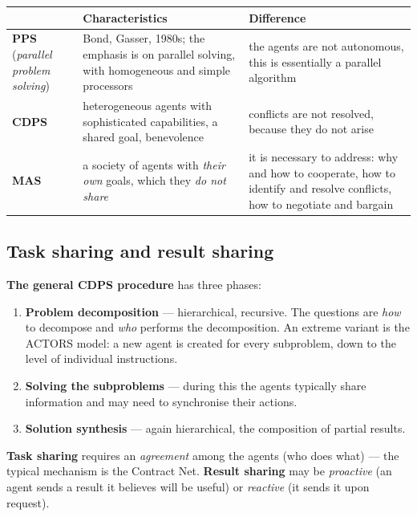 \documentclass[11pt,a4paper]{article}
\theoremstyle{definition}
\begin{document}
\begin{center}\small
\begin{tabular}{p{} p{} p{}}
\toprule
& \textbf{Characteristics} & \textbf{Difference} \\
\midrule
\textbf{PPS} \newline (\emph{parallel problem solving})
  & Bond, Gasser, 1980s; the emphasis is on parallel solving, with homogeneous and simple processors
  & the agents are not autonomous, this is essentially a parallel algorithm \\
\textbf{CDPS}
  & heterogeneous agents with sophisticated capabilities, a shared goal, benevolence
  & conflicts are not resolved, because they do not arise \\
\textbf{MAS}
  & a society of agents with \emph{their own} goals, which they \emph{do not share}
  & it is necessary to address: why and how to cooperate, how to identify and resolve conflicts, how
    to negotiate and bargain \\
\bottomrule
\end{tabular}
\end{center}

\subsection{Task sharing and result sharing}

\textbf{The general CDPS procedure} has three phases:
\begin{enumerate}
\item \textbf{Problem decomposition} --- hierarchical, recursive. The questions are \emph{how} to
  decompose and \emph{who} performs the decomposition. An extreme variant is the ACTORS model: a new
  agent is created for every subproblem, down to the level of individual instructions.
\item \textbf{Solving the subproblems} --- during this the agents typically share information and may
  need to synchronise their actions.
\item \textbf{Solution synthesis} --- again hierarchical, the composition of partial results.
\end{enumerate}

\textbf{Task sharing} requires an \emph{agreement} among the agents (who does what) --- the typical
mechanism is the Contract Net. \textbf{Result sharing} may be \emph{proactive} (an agent sends a
result it believes will be useful) or \emph{reactive} (it sends it upon request).
\end{document}
